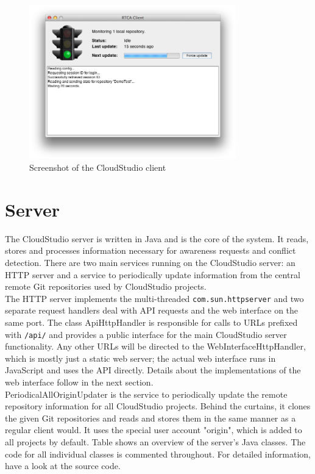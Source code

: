 \begin{figure}[h!]
  \centering
      \includegraphics[width=0.8\textwidth]{gui}
  \caption{Screenshot of the CloudStudio client}
  \label{fig:gui}
\end{figure}








\section{Server}

The CloudStudio server is written in Java and is the core of the system. It reads, stores and processes information necessary for awareness requests and conflict detection. There are two main services running on the CloudStudio server: an HTTP server and a service to periodically update information from the central remote Git repositories used by CloudStudio projects. \\

The HTTP server implements the multi-threaded \texttt{com.sun.httpserver} and two separate request handlers deal with API requests and the web interface on the same port. The class ApiHttpHandler is responsible for calls to URLs prefixed with \texttt{/api/} and provides a public interface for the main CloudStudio server functionality. Any other URLs will be directed to the WebInterfaceHttpHandler, which is mostly just a static web server; the actual web interface runs in JavaScript and uses the API directly. Details about the implementations of the web interface follow in the next section. \\

PeriodicalAllOriginUpdater is the service to periodically update the remote repository information for all CloudStudio projects. Behind the curtains, it clones the given Git repositories and reads and stores them in the same manner as a regular client would. It uses the special user account "origin", which is added to all projects by default. Table \cite{fig:serverclasses} shows an overview of the server's Java classes. The code for all individual classes is commented throughout. For detailed information, have a look at the source code. \\

